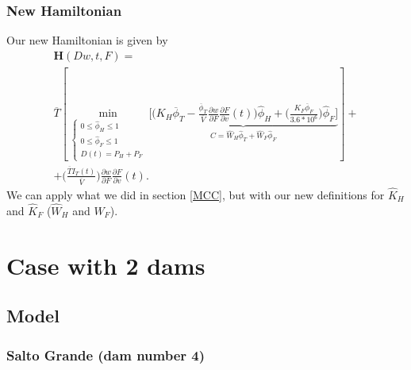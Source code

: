 \documentclass[12pt]{article}
\theoremstyle{definition}
\theoremstyle{remark}
\begin{document}
\subsubsection{New Hamiltonian}

Our new Hamiltonian is given by
\begin{multline*}
\mathbf{H}(Dw,t,F)=\\
\overline{T}\left[\min_{\begin{cases}
0\leq\hat{\phi}_H\leq1\\
0\leq\hat{\phi}_F\leq1\\
D(t)=P_H+P_F
\end{cases}}\underbrace{\Bigg[\Bigg(K_H\overline{\phi}_T-\frac{\overline{\phi}_T}{\overline{V}}\frac{\partial w}{\partial F}\frac{\partial F}{\partial v}(t)\Bigg)\hat{\phi}_H+\Bigg(\frac{K_F\overline{\phi}_F}{3.6*10^6}\Bigg)\hat{\phi}_F\Bigg]}_{C=\hat{W}_H\hat{\phi}_T+\hat{W}_F\hat{\phi}_F}\right]+\\+\Bigg(\frac{\overline{T}I_T(t)}{\overline{V}}\Bigg)\frac{\partial w}{\partial F}\frac{\partial F}{\partial v}(t).
\end{multline*}
We can apply what we did in section \ref{MCC}, but with our new definitions for $\hat{K}_H$ and $\hat{K}_F$ ($\hat{W}_H$ and $\hat{W}_F$).

\section{Case with 2 dams}

\subsection{Model}

\subsubsection{Salto Grande (dam number 4)}
\end{document}
